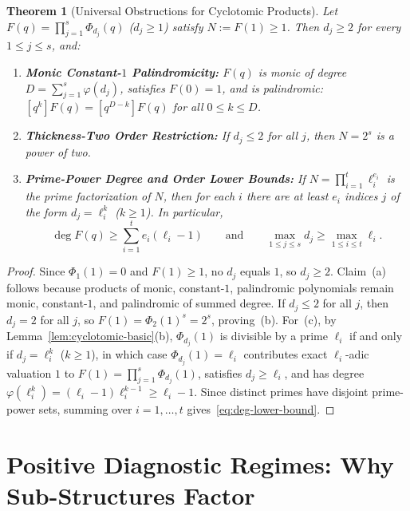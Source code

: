 \documentclass[11pt,a4paper]{article}
\newtheorem{theorem}{Theorem}[section]
\theoremstyle{definition}
\theoremstyle{remark}
\begin{document}
\begin{theorem}[Universal Obstructions for Cyclotomic Products]\label{thm:cyclotomic-obstructions}
Let $F(q) = \prod_{j=1}^s \Phi_{d_j}(q)$ ($d_j \ge 1$) satisfy $N := F(1) \ge 1$. Then $d_j \ge 2$ for every $1 \le j \le s$, and:
\begin{enumerate}
  \item[(a)] \textbf{Monic Constant-$1$ Palindromicity:} $F(q)$ is monic of degree $D = \sum_{j=1}^s \varphi(d_j)$, satisfies $F(0) = 1$, and is palindromic: $[q^k]F(q) = [q^{D-k}]F(q)$ for all $0 \le k \le D$.
  \item[(b)] \textbf{Thickness-Two Order Restriction:} If $d_j \le 2$ for all $j$, then $N = 2^s$ is a power of two.
  \item[(c)] \textbf{Prime-Power Degree and Order Lower Bounds:} If $N = \prod_{i=1}^t \ell_i^{e_i}$ is the prime factorization of $N$, then for each $i$ there are at least $e_i$ indices $j$ of the form $d_j = \ell_i^{k}$ ($k \ge 1$). In particular,
  \begin{equation}\label{eq:deg-lower-bound}
    \deg F(q) \ge \sum_{i=1}^t e_i (\ell_i - 1) \qquad \text{and} \qquad \max_{1 \le j \le s} d_j \ge \max_{1 \le i \le t} \ell_i.
  \end{equation}
\end{enumerate}
\end{theorem}

\begin{proof}
Since $\Phi_1(1) = 0$ and $F(1) \ge 1$, no $d_j$ equals $1$, so $d_j \ge 2$. Claim~(a) follows because products of monic, constant-$1$, palindromic polynomials remain monic, constant-$1$, and palindromic of summed degree. If $d_j \le 2$ for all $j$, then $d_j = 2$ for all $j$, so $F(1) = \Phi_2(1)^s = 2^s$, proving~(b). For~(c), by Lemma~\ref{lem:cyclotomic-basic}(b), $\Phi_{d_j}(1)$ is divisible by a prime $\ell_i$ if and only if $d_j = \ell_i^k$ ($k \ge 1$), in which case $\Phi_{d_j}(1) = \ell_i$ contributes exact $\ell_i$-adic valuation $1$ to $F(1) = \prod_{j=1}^s \Phi_{d_j}(1)$, satisfies $d_j \ge \ell_i$, and has degree $\varphi(\ell_i^k) = (\ell_i - 1)\ell_i^{k-1} \ge \ell_i - 1$. Since distinct primes have disjoint prime-power sets, summing over $i = 1,\dots,t$ gives~\eqref{eq:deg-lower-bound}.
\end{proof}

\section{Positive Diagnostic Regimes: Why Sub-Structures Factor}
\end{document}
